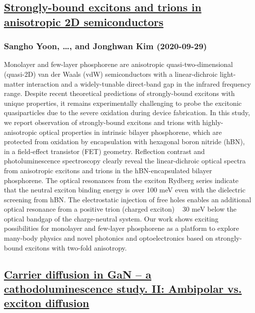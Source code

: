 \subsection*{\href{http://arxiv.org/abs/2009.13992v1}{Strongly-bound excitons and trions in anisotropic 2D semiconductors}}
\subsubsection*{Sangho Yoon, \dots, and Jonghwan Kim (2020-09-29)}
Monolayer and few-layer phosphorene are anisotropic quasi-two-dimensional
(quasi-2D) van der Waals (vdW) semiconductors with a linear-dichroic
light-matter interaction and a widely-tunable direct-band gap in the infrared
frequency range. Despite recent theoretical predictions of strongly-bound
excitons with unique properties, it remains experimentally challenging to probe
the excitonic quasiparticles due to the severe oxidation during device
fabrication. In this study, we report observation of strongly-bound excitons
and trions with highly-anisotropic optical properties in intrinsic bilayer
phosphorene, which are protected from oxidation by encapsulation with hexagonal
boron nitride (hBN), in a field-effect transistor (FET) geometry. Reflection
contrast and photoluminescence spectroscopy clearly reveal the linear-dichroic
optical spectra from anisotropic excitons and trions in the hBN-encapsulated
bilayer phosphorene. The optical resonances from the exciton Rydberg series
indicate that the neutral exciton binding energy is over 100 meV even with the
dielectric screening from hBN. The electrostatic injection of free holes
enables an additional optical resonance from a positive trion (charged exciton)
~ 30 meV below the optical bandgap of the charge-neutral system. Our work shows
exciting possibilities for monolayer and few-layer phosphorene as a platform to
explore many-body physics and novel photonics and optoelectronics based on
strongly-bound excitons with two-fold anisotropy.

\subsection*{\href{http://arxiv.org/abs/2009.13983v1}{Carrier diffusion in GaN -- a cathodoluminescence study. II: Ambipolar  vs. exciton diffusion}}
